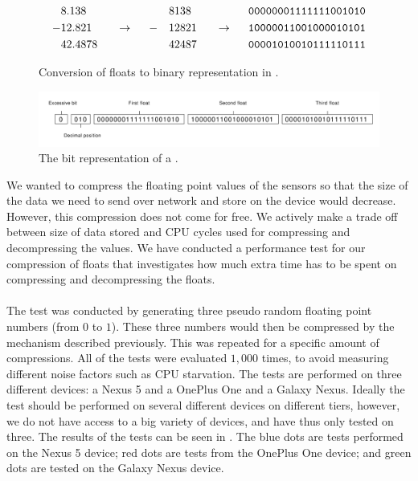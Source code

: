 \begin{figure}[!htbp]
    \begin{alignat*}{6}
       &8.138   &&                   &&   && 8138  &&                   && \text{\texttt{00000001111111001010}} \\
      -&12.821  && ~~ \rightarrow ~~ && - && 12821 && ~~ \rightarrow ~~ && \text{\texttt{10000011001000010101}} \\
       &42.4878 &&                   &&   && 42487 &&                   && \text{\texttt{00001010010111110111}} 
    \end{alignat*}
    \caption{Conversion of floats to binary representation in .}
    \label{fig:float_triple_convert}
\end{figure}
\FloatBarrier

\begin{figure}[!htbp]
    \centering
    \includegraphics[width=\textwidth]{graphic/gathering_sensor_data/float_triple_bit}
    \caption{The bit representation of a .}
    \label{fig:float_triple_bit}
\end{figure}
\FloatBarrier
\newpage
We wanted to compress the floating point values of the sensors so that the size of the data we need to send over network and store on the device would decrease. However, this compression does not come for free. We actively make a trade off between size of data stored and CPU cycles used for compressing and decompressing the values. We have conducted a performance test for our compression of floats that investigates how much extra time has to be spent on compressing and decompressing the floats. 
\\\\
The test was conducted by generating three pseudo random floating point numbers (from $0$ to $1$). These three numbers would then be compressed by the mechanism described previously. This was repeated for a specific amount of compressions. All of the tests were evaluated $1,000$ times, to avoid measuring different noise factors such as CPU starvation. The tests are performed on three different devices: a Nexus 5 and a OnePlus One and a Galaxy Nexus. Ideally the test should be performed on several different devices on different tiers, however, we do not have access to a big variety of devices, and have thus only tested on three. The results of the tests can be seen in . The blue dots are tests performed on the Nexus 5 device; red dots are tests from the OnePlus One device; and green dots are tested on the Galaxy Nexus device.

